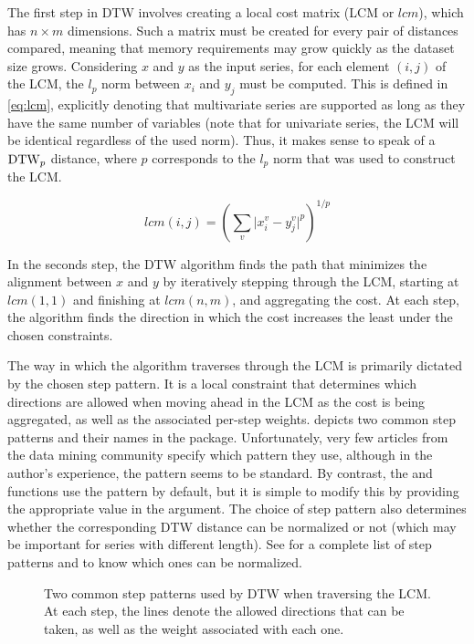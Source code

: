 The first step in DTW involves creating a local cost matrix (LCM  or $lcm$),
which has $n \times m$ dimensions.
Such a matrix must be created for every pair of distances compared,
meaning that memory requirements may grow quickly as the dataset size grows.
Considering $x$ and $y$ as the input series,
for each element $(i,j)$ of the LCM,
the $l_p$ norm between $x_i$ and $y_j$ must be computed.
This is defined in \cref{eq:lcm},
explicitly denoting that multivariate series are supported as long as they have the same number of variables
(note that for univariate series, the LCM will be identical regardless of the used norm).
Thus, it makes sense to speak of a $\text{DTW}_p{}$ distance,
where $p$ corresponds to the $l_p$ norm that was used to construct the LCM.

\begin{equation}
\label{eq:lcm}
lcm(i,j) = \left( \sum_v \lvert x^v_i - y^v_j \rvert ^ p \right) ^ {1/p}
\end{equation}

In the seconds step,
the DTW algorithm finds the path that minimizes the alignment between $x$ and $y$ by iteratively stepping through the LCM,
starting at $lcm(1,1)$ and finishing at $lcm(n,m)$,
and aggregating the cost.
At each step, the algorithm finds the direction in which the cost increases the least under the chosen constraints.

The way in which the algorithm traverses through the LCM is primarily dictated by the chosen step pattern.
It is a local constraint that determines which directions are allowed when moving ahead in the LCM as the cost is being aggregated,
as well as the associated per-step weights.
 depicts two common step patterns and their names in the  package.
Unfortunately, very few articles from the data mining community specify which pattern they use,
although in the author's experience,
the  pattern seems to be standard.
By contrast, the  and  functions use the  pattern by default,
but it is simple to modify this by providing the appropriate value in the  argument.
The choice of step pattern also determines whether the corresponding DTW distance can be normalized or not
(which may be important for series with different length).
See \citet{giorgino2009} for a complete list of step patterns and to know which ones can be normalized.

\begin{figure}[htbp]

{\centering {}

}

\caption{Two common step patterns used by DTW when traversing the LCM. At each step, the lines denote the allowed directions that can be taken, as well as the weight associated with each one.}\label{fig:step-patterns}
\end{figure}

